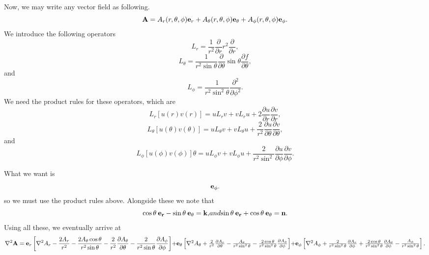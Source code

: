 \documentclass[12pt]{article}
\begin{document}
Now, we may write any vector field as following.
\begin{equation}
{\bf A}=A_r(r, \theta, \phi){\bf e}_r
+A_\theta(r, \theta, \phi){\bf e}_\theta+A_\phi(r, \theta, \phi)
 {\bf e}_\phi.
\end{equation}
We introduce the following operators
\begin{equation}
L_r=\frac{1}{r^2} \frac{\partial}{\partial r} 
 r^2 \frac{\partial}{\partial r}, 
\end{equation}
\begin{equation}
L_\theta=
\frac{1}{r^2 \sin \theta} \frac{\partial }{\partial \theta}
\sin \theta \frac{\partial f }{\partial \theta}, 
\end{equation}
and
\begin{equation}
L_\phi=\frac{1}{r^2 \sin^2 \theta}
\frac{\partial^2}{\partial \phi^2}.
\end{equation}
We need the product rules for these operators, which are
\begin{equation}
L_r[u(r)v(r)]
= u L_r v  +v L_r u + 
2 \frac{\partial u}{\partial r}
 \frac{\partial v}{\partial r},
\end{equation}
\begin{equation}
L_\theta[u(\theta)v(\theta)]
= u L_\theta v +v L_\theta u + 
\frac{2}{r^2} \frac{\partial u}{\partial \theta}
 \frac{\partial v}{\partial \theta},
\end{equation}
and
\begin{equation}
L_\phi [u(\phi)v(\phi)]
\theta
= u L_\phi v +v L_\phi u + 
\frac{2}{r^2 \sin^2} \frac{\partial u}{\partial \phi}
 \frac{\partial v}{\partial \phi}.
\end{equation}

What we want is 
\begin{equation}
[L_r+L_\theta+L_\phi][A_r(r, \theta, \phi){\bf e}_r
+A_\theta(r, \theta, \phi){\bf e}_\theta+A_\phi(r, \theta, \phi)]
 {\bf e}_\phi.
\end{equation}
so we must use the product rules above. Alongside these we note that
\begin{equation}
\cos \theta \> {\bf e_r}-\sin \theta \> {\bf e}_\theta
={\bf k}, 
$$ and   $$
\sin  \theta \> {\bf e_r}+\cos  \theta \> {\bf e}_\theta
={\bf n}.
\end{equation}
Using all these, we eventually arrive at
\begin{equation}
\nabla^2 {\bf A}
={\bf e}_r \left \lbrack
\nabla^2 A_r -\frac{2 A_r}{r^2}
- \frac{ 2 A_\theta \cos \theta}{r^2 \sin \theta}
- \frac{2}{r^2} \frac{\partial A_\theta}{\partial \theta}
-\frac{2}{r^2 \sin \theta} \frac{\partial A_\phi}{\partial \phi}
\right \rbrack
$$    $$
+ {\bf e_\theta} \left \lbrack
\nabla^2 A_\theta + 
\frac{2}{r^2} \frac{\partial A_r}{\partial \theta}
-\frac{A_\theta}{r^2 \sin^2 \theta}
-\frac{2 \cos \theta}{r^2 \sin^2 \theta} 
\frac{\partial A_\phi}{\partial \phi} \right \rbrack
$$   $$
+{\bf e_\phi} \left \lbrack
\nabla^2 A_\phi
+ \frac{2}{r^2 \sin^2 \theta} \frac{\partial A_r}{\partial \phi}
+ \frac{2 \cos \theta}{r^2 \sin^2 \theta}
\frac{\partial A_\theta}{\partial \phi}
-\frac{A_\phi}{r^2 \sin^2 \theta} \right \rbrack.
\end{equation}
\end{document}
